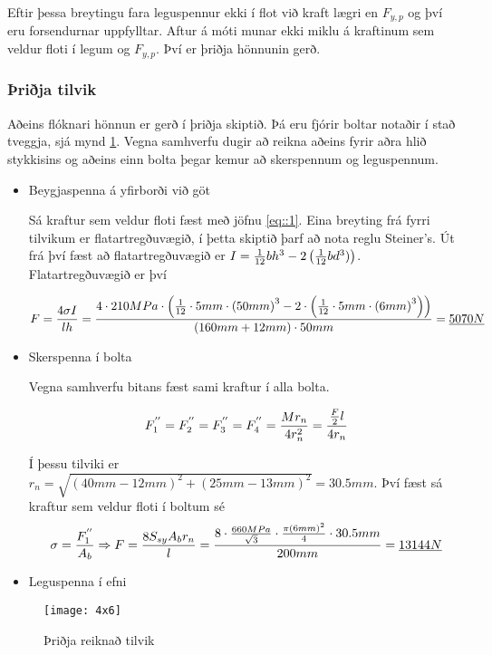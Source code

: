 Eftir þessa breytingu fara leguspennur ekki í flot við kraft lægri en $F_{y,p}$ og því eru forsendurnar uppfylltar. Aftur á móti munar ekki miklu á kraftinum sem veldur floti í legum og $F_{y,p}$. Því er þriðja hönnunin gerð.

\subsubsection{Þriðja tilvik}

Aðeins flóknari hönnun er gerð í þriðja skiptið. Þá eru fjórir boltar notaðir í stað tveggja, sjá mynd \ref{fig::4x6}. Vegna samhverfu dugir að reikna aðeins fyrir aðra hlið stykkisins og aðeins einn bolta þegar kemur að skerspennum og leguspennum. 

\begin{itemize}
	\item Beygjaspenna á yfirborði við göt
	
	Sá kraftur sem veldur floti fæst með jöfnu \ref{eq::1}. Eina breyting frá fyrri tilvikum er flatartregðuvægið, í þetta skiptið þarf að nota reglu Steiner's. Út frá því fæst að flatartregðuvægið er $I = {1 \over 12}bh^3 - 2\left({1 \over 12}bd^3)\right)$. Flatartregðuvægið er því
	
	\[
	F = \frac{4 \sigma I}{l h} = {4 \cdot 210 MPa \cdot \left({1 \over 12} \cdot 5 mm \cdot \left(50mm\right)^3 - 2 \cdot \left({1 \over 12} \cdot 5 mm \cdot \left(6mm\right)^3\right)\right) \over (160 mm + 12 mm) \cdot 50 mm} = \underline{5070N}
	\] 
	
	\item Skerspenna í bolta
	
	Vegna samhverfu bitans fæst sami kraftur í alla bolta. 
	
	\[
	F_1^{''} = F_2^{''} = F_3^{''} = F_4^{''} = {Mr_n \over 4r_n^2} = {{F \over 2}l \over 4 r_n} 
	\]
	
	Í þessu tilviki er $r_n = \sqrt{(40mm - 12mm)^2 + (25mm - 13mm)^2} = 30.5 mm$. Því fæst sá kraftur sem veldur floti í boltum sé 
		\[
		\sigma = {F_1^{''} \over A_b} \Rightarrow F = {8 S_{sy} A_b r_n \over l} = {8 \cdot {660MPa \over \sqrt{3}} \cdot {\pi \left(6mm\right)^2 \over 4} \cdot 30.5 mm \over 200 mm} = \underline{13144N}
		\]
	
	
	\item Leguspenna í efni
\end{itemize}

\begin{figure}
	\centering
	\texttt{[image: 4x6]}
	\caption{Þriðja reiknað tilvik}
	\label{fig::4x6}
\end{figure}